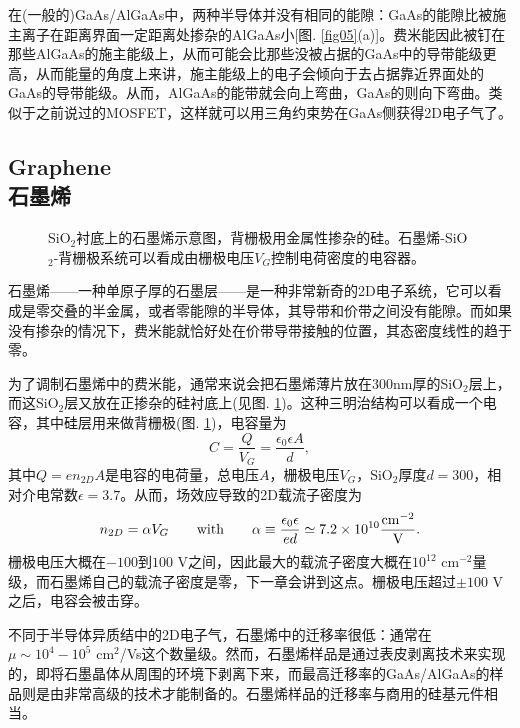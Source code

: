 \documentclass[10pt]{book}
\newcommand{\beq}{\begin{equation}}
\newcommand{\eeq}{\end{equation}}
\begin{document}
在(一般的)GaAs/AlGaAs中，两种半导体并没有相同的能隙：GaAs的能隙比被施主离子在距离界面一定距离处掺杂的AlGaAs小[图. \ref{fig05}(a)]。费米能因此被钉在那些AlGaAs的施主能级上，从而可能会比那些没被占据的GaAs中的导带能级更高，从而能量的角度上来讲，施主能级上的电子会倾向于去占据靠近界面处的GaAs的导带能级。从而，AlGaAs的能带就会向上弯曲，GaAs的则向下弯曲。类似于之前说过的MOSFET，这样就可以用三角约束势在GaAs侧获得2D电子气了。

\subsection[石墨烯]{Graphene\\\bf 石墨烯}
\label{SecGraph}

\begin{figure}
\begin{center}
\end{center}
\caption{ SiO$_2$衬底上的石墨烯示意图，背栅极用金属性掺杂的硅。石墨烯-SiO$_2$-背栅极系统可以看成由栅极电压$V_G$控制电荷密度的电容器。}
\label{fig06}
\end{figure}

石墨烯——一种单原子厚的石墨层——是一种非常新奇的2D电子系统，它可以看成是零交叠的半金属，或者零能隙的半导体，其导带和价带之间没有能隙。而如果没有掺杂的情况下，费米能就恰好处在价带导带接触的位置，其态密度线性的趋于零。

为了调制石墨烯中的费米能，通常来说会把石墨烯薄片放在$300$nm厚的SiO$_2$层上，而这SiO$_2$层又放在正掺杂的硅衬底上(见图. \ref{fig06})。这种三明治结构可以看成一个电容，其中硅层用来做背栅极(图. \ref{fig06})，电容量为
\beq\label{condenser}
C=\frac{Q}{V_G}=\frac{\epsilon_0\epsilon A}{d},
\eeq
其中$Q=en_{2D}A$是电容的电荷量，总电压$A$，栅极电压$V_G$，SiO$_2$厚度$d=300$，相对介电常数$\epsilon=3.7$。从而，场效应导致的2D载流子密度为
\beq\label{InducedDens}
n_{2D}=\alpha V_G \qquad {\rm with} \qquad \alpha\equiv\frac{\epsilon_0\epsilon}{ed}
\simeq 7.2\times 10^{10} \frac{{\rm cm}^{-2}}{\rm V}.
\eeq
栅极电压大概在$-100$到$100$ V之间，因此最大的载流子密度大概在$10^{12}$ cm$^{-2}$量级，而石墨烯自己的载流子密度是零，下一章会讲到这点。栅极电压超过$\pm 100$ V之后，电容会被击穿。

不同于半导体异质结中的2D电子气，石墨烯中的迁移率很低：通常在$\mu\sim 10^{4}-10^{5}$ cm$^2$/Vs这个数量级。然而，石墨烯样品是通过表皮剥离技术来实现的，即将石墨晶体从周围的环境下剥离下来，而最高迁移率的GaAs/AlGaAs的样品则是由非常高级的技术才能制备的。石墨烯样品的迁移率与商用的硅基元件相当。
\end{document}
